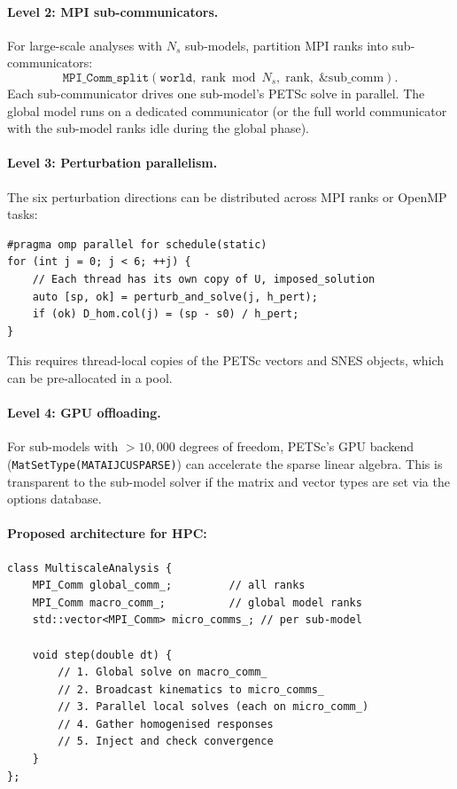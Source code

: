 \paragraph{Level 2: MPI sub-communicators.}
For large-scale analyses with $N_s$ sub-models, partition MPI
ranks into sub-communicators:
\begin{equation}
  \texttt{MPI\_Comm\_split}(\texttt{world}, \;
    \text{rank} \bmod N_s, \; \text{rank}, \; \&\text{sub\_comm}).
\end{equation}
Each sub-communicator drives one sub-model's PETSc solve in
parallel.  The global model runs on a dedicated communicator (or
the full world communicator with the sub-model ranks idle during
the global phase).

\paragraph{Level 3: Perturbation parallelism.}
The six perturbation directions can be distributed across MPI ranks
or OpenMP tasks:
\begin{lstlisting}[caption={Parallelised perturbation tangent.}]
#pragma omp parallel for schedule(static)
for (int j = 0; j < 6; ++j) {
    // Each thread has its own copy of U, imposed_solution
    auto [sp, ok] = perturb_and_solve(j, h_pert);
    if (ok) D_hom.col(j) = (sp - s0) / h_pert;
}
\end{lstlisting}
This requires thread-local copies of the PETSc vectors and SNES
objects, which can be pre-allocated in a pool.

\paragraph{Level 4: GPU offloading.}
For sub-models with $>10{,}000$ degrees of freedom, PETSc's GPU
backend (\texttt{MatSetType(MATAIJCUSPARSE)}) can accelerate the
sparse linear algebra.  This is transparent to the sub-model solver
if the matrix and vector types are set via the options database.

\paragraph{Proposed architecture for HPC:}
\begin{lstlisting}[caption={HPC-aware \texttt{MultiscaleAnalysis}.}]
class MultiscaleAnalysis {
    MPI_Comm global_comm_;         // all ranks
    MPI_Comm macro_comm_;          // global model ranks
    std::vector<MPI_Comm> micro_comms_; // per sub-model
    
    void step(double dt) {
        // 1. Global solve on macro_comm_
        // 2. Broadcast kinematics to micro_comms_
        // 3. Parallel local solves (each on micro_comm_)
        // 4. Gather homogenised responses
        // 5. Inject and check convergence
    }
};
\end{lstlisting}


